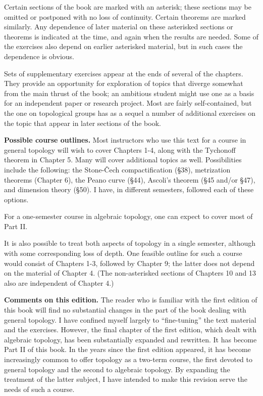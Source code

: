 Certain sections of the book are marked with an asterisk; these sections may be 
omitted or postponed with no loss of continuity. Certain theorems are marked similarly. 
Any dependence of later material on these asterisked sections or theorems is indicated 
at the time, and again when the results are needed. Some of the exercises also depend 
on earlier asterisked material, but in such cases the dependence is obvious.

Sets of supplementary exercises appear at the ends of several of the chapters. 
They provide an opportunity for exploration of topics that diverge somewhat from 
the main thrust of the book; an ambitious student might use one as a basis for an 
independent paper or research project. Most are fairly self-contained, but the one 
on topological groups has as a sequel a number of additional exercises on the topic 
that appear in later sections of the book.

\noindent\textbf{Possible course outlines. }Most instructors who use this text for a 
course in general topology will wish to cover Chapters 1-4, along with the Tychonoff 
theorem in Chapter 5. Many will cover additional topics as well. Possibilities include 
the following: the Stone-Čech compactification (\S38), metrization theorems 
(Chapter 6), the Peano curve (\S44), Ascoli's theorem (\S45 and/or \S47), and 
dimension theory (\S50). I have, in different semesters, followed each of these options.

For a one-semester course in algebraic topology, one can expect to cover most of Part II.

It is also possible to treat both aspects of topology in a single semester, although 
with some corresponding loss of depth. One feasible outline for such a course would 
consist of Chapters 1-3, followed by Chapter 9; the latter does not depend on the 
material of Chapter 4. (The non-asterisked sections of Chapters 10 and 13 also are 
independent of Chapter 4.)

\noindent\textbf{Comments on this edition.} The reader who is familiar with the first 
edition of this book will find no substantial changes in the part of the book dealing 
with general topology. I have confined myself largely to ``fine-tuning'' the text 
material and the exercises. However, the final chapter of the first edition, which 
dealt with algebraic topology, has been substantially expanded and rewritten. It has 
become Part II of this book. In the years since the first edition appeared, it has 
become increasingly common to offer topology as a two-term course, the first devoted 
to general topology and the second to algebraic topology. By expanding the treatment 
of the latter subject, I have intended to make this revision serve the needs of such 
a course.

